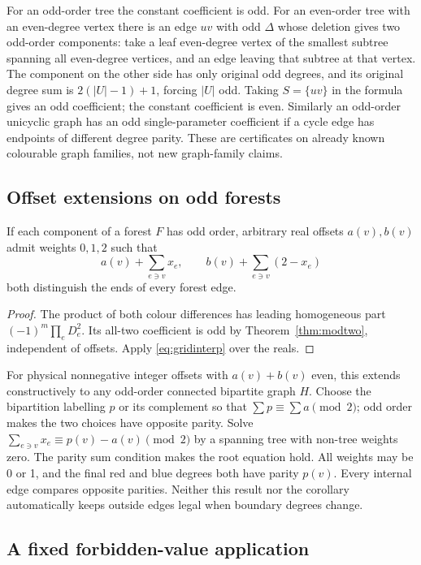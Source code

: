 For an odd-order tree the constant coefficient is odd. For an
even-order tree with an even-degree vertex there is an edge $uv$
with odd $\Delta$ whose deletion gives two odd-order components:
take a leaf even-degree vertex of the smallest subtree spanning all
even-degree vertices, and an edge leaving that subtree at that
vertex. The component on the other side has only original odd degrees,
and its original degree sum is $2(|U|-1)+1$, forcing $|U|$ odd.
Taking $S=\{uv\}$ in the formula gives an odd coefficient; the
constant coefficient is even. Similarly an odd-order unicyclic graph
has an odd single-parameter coefficient if a cycle edge has
endpoints of different degree parity. These are certificates on
already known colourable graph families, not new graph-family claims.

\subsection{Offset extensions on odd forests}\label{sec:oddforest}

\begin{corollary}\label{cor:oddforest}
If each component of a forest $F$ has odd order, arbitrary real
offsets $a(v),b(v)$ admit weights $0,1,2$ such that
\[
 a(v)+\sum_{e\ni v}x_e,\qquad
 b(v)+\sum_{e\ni v}(2-x_e)
\]
both distinguish the ends of every forest edge.
\end{corollary}
\begin{proof}
The product of both colour differences has leading homogeneous part
$(-1)^m\prod_e D_e^2$. Its all-two coefficient is odd by
Theorem~\ref{thm:modtwo}, independent of offsets. Apply
\eqref{eq:gridinterp} over the reals.
\end{proof}

For physical nonnegative integer offsets with $a(v)+b(v)$ even,
this extends constructively to any odd-order connected bipartite
graph $H$. Choose the bipartition labelling $p$ or its complement
so that $\sum p\equiv\sum a\pmod2$; odd order makes the two
choices have opposite parity. Solve
$\sum_{e\ni v}x_e\equiv p(v)-a(v)\pmod2$ by a spanning tree
with non-tree weights zero. The parity sum condition makes the root
equation hold. All weights may be 0 or 1, and the final red and
blue degrees both have parity $p(v)$. Every internal edge compares
opposite parities. Neither this result nor the corollary automatically
keeps outside edges legal when boundary degrees change.

\subsection{A fixed forbidden-value application}

